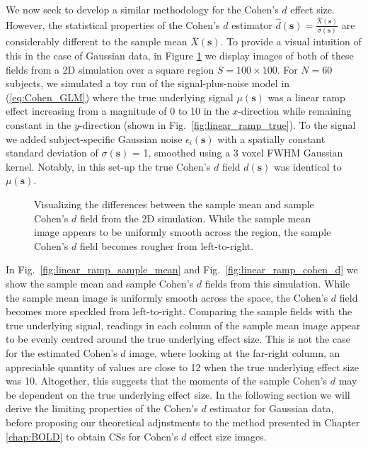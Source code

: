 We now seek to develop a similar methodology for the Cohen's $d$ effect size. However, the statistical properties of the Cohen's $d$ estimator $\hat{d}(\bm{s}) = \frac{\bar{X}(\bm{s})}{\hat{\sigma}(\bm{s})}$ are considerably different to the sample mean $\bar{X}(\bm{s})$. To provide a visual intuition of this in the case of Gaussian data, in Figure \ref{fig:visual_example} we display images of both of these fields from a 2D simulation over a square region $S = 100 \times 100$. For $N = 60$ subjects, we simulated a toy run of the signal-plus-noise model in (\ref{eq:Cohen_GLM}) where the true underlying signal $\mu(\bm{s})$ was a linear ramp effect increasing from a magnitude of 0 to 10 in the $x$-direction while remaining constant in the $y$-direction (shown in Fig.\ \ref{fig:linear_ramp_true}). To the signal we added subject-specific Gaussian noise $\epsilon_{i}(\bm{s})$ with a spatially constant standard deviation of $\sigma(\bm{s})$ = 1, 
smoothed using a 3 voxel FWHM Gaussian kernel. Notably, in this set-up the true Cohen's $d$ field $d(\bm{s})$ was identical to $\mu(\bm{s})$.
\begin{figure}[htbp]
  \centering

  \hspace{1em}
  \caption{Visualizing the differences between the sample mean and sample Cohen's $d$ field from the 2D simulation. While the sample mean image appears to be uniformly smooth across the region, the sample Cohen's $d$ field becomes rougher from left-to-right.}
\label{fig:visual_example}
\end{figure}

In Fig.\ \ref{fig:linear_ramp_sample_mean} and Fig.\ \ref{fig:linear_ramp_cohen_d} we show the sample mean and sample Cohen's $d$ fields from this simulation. While the sample mean image is uniformly smooth across the space, the Cohen's $d$ field becomes more speckled from left-to-right. Comparing the sample fields with the true underlying signal, readings in each column of the sample mean image appear to be evenly centred around the true underlying effect size. This is not the case for the estimated Cohen's $d$ image, where looking at the far-right column, an appreciable quantity of values are close to 12 when the true underlying effect size was 10. Altogether, this suggests that the moments of the sample Cohen's $d$ may be dependent on the true underlying effect size. In the following section we will derive the limiting properties of the Cohen's $d$ estimator for Gaussian data, before proposing our theoretical adjustments to the method presented in Chapter \ref{chap:BOLD} to obtain CSs for Cohen's $d$ effect size images. 

